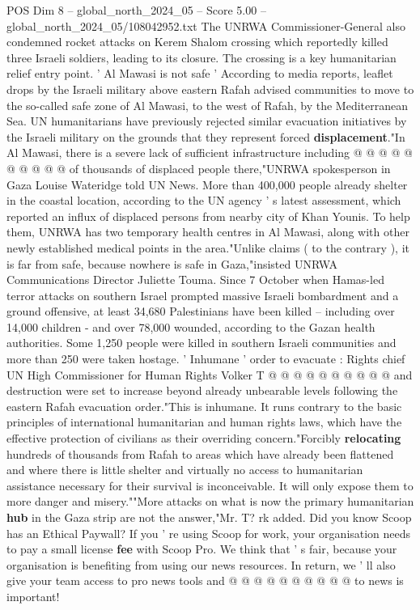 \begin{textsample}{POS Dim 8 – global\_north\_2024\_05 – Score 5.00 – global\_north\_2024\_05/108042952.txt}
The UNRWA Commissioner-General also condemned rocket attacks on Kerem Shalom crossing which reportedly killed three Israeli soldiers, leading to its closure.
The crossing is a key humanitarian relief entry point. ' Al Mawasi is not safe ' According to media reports, leaflet drops by the Israeli military above eastern Rafah advised communities to move to the so-called safe zone of Al Mawasi, to the west of Rafah, by the Mediterranean Sea.
UN humanitarians have previously rejected similar evacuation initiatives by the Israeli military on the grounds that they represent forced \textbf{displacement}."In Al Mawasi, there is a severe lack of sufficient infrastructure including @ @ @ @ @ @ @ @ @ @ of thousands of displaced people there,"UNRWA spokesperson in Gaza Louise Wateridge told UN News.
More than 400,000 people already shelter in the coastal location, according to the UN agency ' s latest assessment, which reported an influx of displaced persons from nearby city of Khan Younis.
To help them, UNRWA has two temporary health centres in Al Mawasi, along with other newly established medical points in the area."Unlike claims ( to the contrary ), it is far from safe, because nowhere is safe in Gaza,"insisted UNRWA Communications Director Juliette Touma.
Since 7 October when Hamas-led terror attacks on southern Israel prompted massive Israeli bombardment and a ground offensive, at least 34,680 Palestinians have been killed -- including over 14,000 children - and over 78,000 wounded, according to the Gazan health authorities.
Some 1,250 people were killed in southern Israeli communities and more than 250 were taken hostage. ' Inhumane ' order to evacuate : Rights chief UN High Commissioner for Human Rights Volker T @ @ @ @ @ @ @ @ @ @ and destruction were set to increase beyond already unbearable levels following the eastern Rafah evacuation order."This is inhumane.
It runs contrary to the basic principles of international humanitarian and human rights laws, which have the effective protection of civilians as their overriding concern."Forcibly \textbf{relocating} hundreds of thousands from Rafah to areas which have already been flattened and where there is little shelter and virtually no access to humanitarian assistance necessary for their survival is inconceivable.
It will only expose them to more danger and misery.""More attacks on what is now the primary humanitarian \textbf{hub} in the Gaza strip are not the answer,"Mr.
T? rk added.
Did you know Scoop has an Ethical Paywall?
If you ' re using Scoop for work, your organisation needs to pay a small license \textbf{fee} with Scoop Pro.
We think that ' s fair, because your organisation is benefiting from using our news resources.
In return, we ' ll also give your team access to pro news tools and @ @ @ @ @ @ @ @ @ @ to news is important!

\end{textsample}
